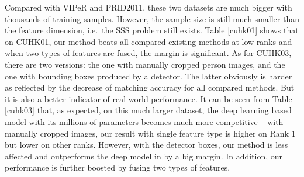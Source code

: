 \documentclass[10pt,twocolumn,letterpaper]{article}
\begin{document}
 \quad Compared with VIPeR and PRID2011, these two datasets are much bigger with thousands of training samples. However, the sample size is still much smaller than the feature dimension, i.e.~the SSS problem still exists. Table \ref{cuhk01}  shows that on CUHK01, our method beats all compared existing methods at low ranks and when two types of features are fused, the margin is significant. As for CUHK03, there are two versions: the one with manually cropped person images, and the one with bounding boxes produced by a detector. The latter obviously is harder  as reflected by the decrease of matching accuracy for all compared methods. But it is also a better indicator of real-world performance. It can be seen from Table \ref{cuhk03} that, as expected, on this much larger dataset, the deep learning based model \cite{ahmed2015improved} with its millions of parameters becomes much more competitive -- with manually cropped images, our result with single feature type is higher on Rank 1 but lower on other ranks. However, with the detector boxes, our method is less affected and outperforms the deep model in \cite{ahmed2015improved} by a big margin. In addition, our performance is further boosted by fusing two types of features. 
\end{document}
